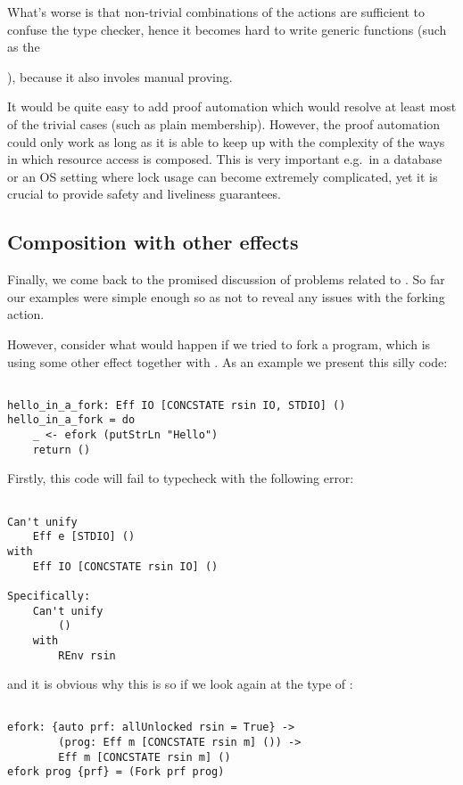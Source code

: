 What's worse is that non-trivial combinations of the  actions
are sufficient to confuse the type checker, hence it becomes hard to write
generic functions (such as the {), because it also
involes manual proving.

It would be quite easy to add proof automation which would resolve at least
most of the trivial cases (such as plain membership). However, the proof
automation could only work as long as it is able to keep up with the complexity
of the ways in which resource access is composed. This is very important
e.g.~in a database or an OS setting where lock usage can become extremely
complicated, yet it is crucial to provide safety and liveliness guarantees.

\subsection{Composition with other effects}

Finally, we come back to the promised discussion of problems related to
. So far our examples were simple enough so as not to reveal any
issues with the forking action.

However, consider what would happen if we tried to fork a program, which is
using some other effect together with . As an example we
present this silly code:

\begin{BVerbatim}

hello_in_a_fork: Eff IO [CONCSTATE rsin IO, STDIO] ()
hello_in_a_fork = do
    _ <- efork (putStrLn "Hello")
    return ()

\end{BVerbatim}

Firstly, this code will fail to typecheck with the following error:

\begin{BVerbatim}

Can't unify
    Eff e [STDIO] ()
with
    Eff IO [CONCSTATE rsin IO] ()

Specifically:
    Can't unify
        ()
    with
        REnv rsin

\end{BVerbatim}

and it is obvious why this is so if we look again at the type of :

\begin{BVerbatim}

efork: {auto prf: allUnlocked rsin = True} ->
        (prog: Eff m [CONCSTATE rsin m] ()) ->
        Eff m [CONCSTATE rsin m] ()
efork prog {prf} = (Fork prf prog)


\end{BVerbatim}}
